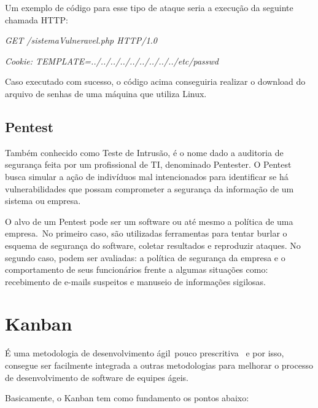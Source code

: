 \documentclass[
    12pt,               %
    openright,          %
    oneside,            %
    a4paper,            %
    section=TITLE,     %
    english,            %
    french,             %
    spanish,            %
    brazil              %
    ]{abntex2}
\newcommand{\citep}{\cite}
\begin{document}
Um exemplo de código para esse tipo de ataque seria a execução da seguinte chamada HTTP:



\begin{center}
\emph{GET /sistemaVulneravel.php HTTP/1.0}
\end{center}



\begin{center}
\emph{Cookie: TEMPLATE=../../../../../../../../../etc/passwd}
\end{center}


Caso executado com sucesso, o código acima conseguiria realizar o download do arquivo de senhas de uma máquina que utiliza Linux.



\subsection{Pentest}

Também conhecido como Teste de Intrusão, é o nome dado a auditoria de segurança feita por um profissional de TI, denominado Pentester. O Pentest busca simular a ação de indivíduos mal intencionados para identificar se há vulnerabilidades que possam comprometer a segurança da informação de um sistema ou empresa.


O alvo de um Pentest pode ser um software ou até mesmo a política de uma empresa.~No primeiro caso, são utilizadas ferramentas para tentar burlar o esquema de segurança do software, coletar resultados e reproduzir ataques. No segundo caso, podem ser avaliadas: a política de segurança da empresa e o comportamento de seus funcionários frente a algumas situações como: recebimento de e-mails suspeitos e manuseio de informações sigilosas.



\section{Kanban}

É uma metodologia de desenvolvimento ágil~pouco prescritiva \citep{62235}~e por isso, consegue ser facilmente integrada a outras metodologias para melhorar o processo de desenvolvimento de software de equipes ágeis.


Basicamente, o Kanban tem como fundamento os pontos abaixo:
\end{document}
